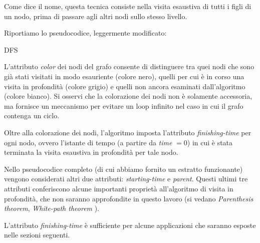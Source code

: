 Come dice il nome, questa tecnica consiste nella visita esaustiva di tutti i figli di un nodo, prima di passare agli altri nodi sullo stesso livello.

Riportiamo lo pseudocodice, leggermente modificato:\\
\begin{algorithm}[H]
    \label{alg:dfs}
    \caption{DFS}
    \SetAlgoLined
\end{algorithm}
L'attributo \emph{color} dei nodi del grafo consente di distinguere tra quei nodi che sono già stati visitati in modo esauriente (colore nero), quelli per cui è in corso una visita in profondità (colore grigio) e quelli non ancora esaminati dall'algoritmo (colore bianco). Si osservi che la colorazione dei nodi non è solamente accessoria, ma fornisce un meccanismo per evitare un loop infinito nel caso in cui il grafo contenga un ciclo.

Oltre alla colorazione dei nodi, l'algoritmo imposta l'attributo \emph{finishing-time} per ogni nodo, ovvero l'istante di tempo (a partire da \emph{time} $= 0$) in cui è stata terminata la visita esaustiva in profondità per tale nodo.

Nello pseudocodice completo (di cui abbiamo fornito un estratto funzionante) vengono considerati altri due attributi: \emph{starting-time} e \emph{parent}. Questi ultimi tre attributi conferiscono alcune importanti proprietà all'algoritmo di visita in profondità, che non saranno approfondite in questo lavoro (si vedano \emph{Parenthesis theorem}, \emph{White-path theorem} \cite{clrs}).

L'attributo \emph{finishing-time} è sufficiente per alcune applicazioni che saranno esposte nelle sezioni seguenti.
